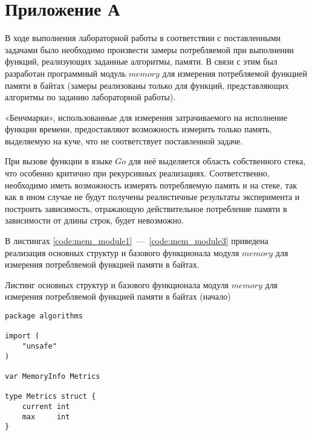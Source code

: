 \setcounter{chapter}{5}
\setcounter{listing}{0}
\chapter*{Приложение А}
\label{appendix}

В ходе выполнения лабораторной работы в соответствии с поставленными задачами было необходимо произвести замеры потребляемой при выполнении функций, реализующих заданные алгоритмы, памяти. В связи с этим был разработан программный модуль $memory$ для измерения потребляемой функцией памяти в байтах (замеры реализованы только для функций, представляющих алгоритмы по заданию лабораторной работы). 

«Бенчмарки», использованные для измерения затрачиваемого на исполнение функции времени, предоставляют возможность измерить только память, выделяемую на куче, что не соответствует поставленной задаче. 

При вызове функции в языке $Go$ для неё выделяется область собственного стека, что особенно критично при рекурсивных реализациях. Соответственно, необходимо иметь возможность измерять потребляемую память и на стеке, так как в ином случае не будут получены реалистичные результаты эксперимента и построить зависимость, отражающую действительное потребление памяти в зависимости от длины строк, будет невозможно.

В листингах \ref{code:mem_module1}~---~\ref{code:mem_module3} приведена реализация основных структур и базового функционала модуля $memory$ для измерения потребляемой функцией памяти в байтах.

\begin{code}
\caption{Листинг основных структур и базового функционала модуля $memory$ для измерения потребляемой функцией памяти в байтах (начало)}
\label{code:mem_module1}

\begin{verbatim}
package algorithms

import (
	"unsafe"
)

var MemoryInfo Metrics

type Metrics struct {
	current int
	max     int
}
\end{verbatim}
\end{code}

\newpage

